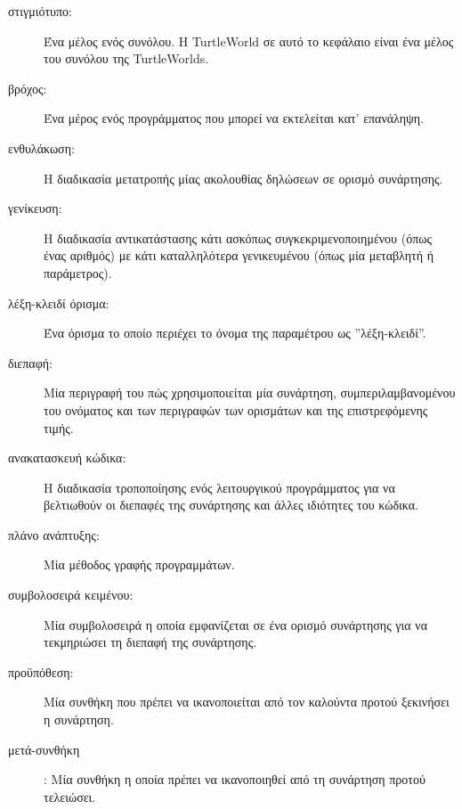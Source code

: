 \documentclass[10pt]{book}
\newcommand{\en}{\selectlanguage{english}}
\newcommand{\gr}{\selectlanguage{greek}}
\begin{document}
\begin{description}

\item[στιγμιότυπο:] Ένα μέλος ενός συνόλου. Η \en TurtleWorld \gr σε αυτό το κεφάλαιο
είναι ένα μέλος του συνόλου της \en TurtleWorlds.
\gr

\item[βρόχος:] Ένα μέρος ενός προγράμματος που μπορεί να εκτελείται κατ' επανάληψη.

\item[ενθυλάκωση:] Η διαδικασία μετατροπής μίας ακολουθίας δηλώσεων σε ορισμό συνάρτησης.

\item[γενίκευση:] Η διαδικασία αντικατάστασης κάτι ασκόπως συγκεκριμενοποιημένου
(όπως ένας αριθμός) με κάτι καταλληλότερα γενικευμένου (όπως μία μεταβλητή ή παράμετρος).

\item[λέξη-κλειδί όρισμα:] Ένα όρισμα το οποίο περιέχει το όνομα της παραμέτρου ως ''λέξη-κλειδί''.

\item[διεπαφή:] Μία περιγραφή του πώς χρησιμοποιείται μία συνάρτηση, συμπεριλαμβανομένου του
ονόματος και των περιγραφών των ορισμάτων και της επιστρεφόμενης τιμής.

\item[ανακατασκευή κώδικα:] Η διαδικασία τροποποίησης ενός λειτουργικού προγράμματος για να βελτιωθούν οι
διεπαφές της συνάρτησης και άλλες ιδιότητες του κώδικα.

\item[πλάνο ανάπτυξης:] Μία μέθοδος γραφής προγραμμάτων.

\item[συμβολοσειρά κειμένου:] Μία συμβολοσειρά η οποία εμφανίζεται σε ένα ορισμό συνάρτησης
για να τεκμηριώσει τη διεπαφή της συνάρτησης.

\item[προϋπόθεση:] Μία συνθήκη που πρέπει να ικανοποιείται από τον καλούντα προτού ξεκινήσει η συνάρτηση.

\item[μετά-συνθήκη]: Μία συνθήκη η οποία πρέπει να ικανοποιηθεί από τη συνάρτηση προτού
τελειώσει.

\end{description}
\end{document}
